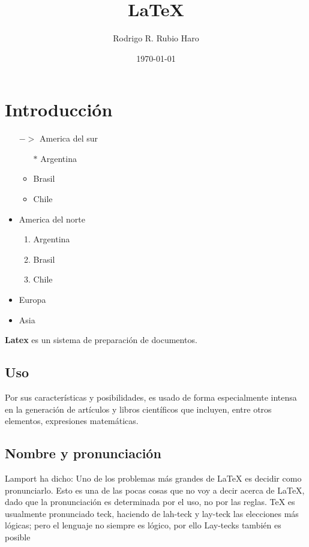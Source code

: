 \documentclass[a4paper]{article}
\title{LaTeX}
\author{Rodrigo R. Rubio Haro}
\date{\today}
\begin{document}
\thispagestyle{empty}

\maketitle
\tableofcontents 
\newpage

    \section{Introducción}
    
    \begin{itemize}
        \item[$->$] America del sur
        \begin{itemize}
            \item[$*$] Argentina
            \item Brasil
            \item Chile
        \end{itemize}
        \item America del norte
        \begin{enumerate}
            \item Argentina
            \item Brasil
            \item Chile
        \end{enumerate}
        \item Europa
        \item Asia
    \end{itemize}



    \textbf{Latex}  es un sistema \color{black} de preparación de documentos.
    
    \subsection{Uso}
    Por sus características y posibilidades, es usado de forma especialmente intensa en la generación de artículos y libros científicos que incluyen, entre otros elementos, expresiones matemáticas.
    \subsection{Nombre y pronunciación}
    Lamport ha dicho: Uno de los problemas más grandes de LaTeX es decidir como pronunciarlo. Esto es una de las pocas cosas que no voy a decir acerca de LaTeX, dado que la pronunciación es determinada por el uso, no por las reglas. TeX es usualmente pronunciado teck, haciendo de lah-teck y lay-teck las elecciones más lógicas; pero el lenguaje no siempre es lógico, por ello Lay-tecks también es posible
\end{document}
